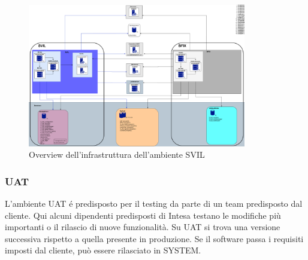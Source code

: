 \begin{figure}[!ht]
    \centering
	\includegraphics[width=0.85\textwidth]{./res/img/svil-diag.png}
    \caption{Overview dell'infrastruttura dell'ambiente SVIL}
\end{figure}

\subsubsection{UAT}

L'ambiente UAT é predisposto per il testing da parte di un team predisposto dal cliente. Qui alcuni dipendenti predisposti di Intesa testano le modifiche più importanti o il rilascio di nuove funzionalità. Su UAT si trova una versione successiva rispetto a quella presente in produzione. Se il software passa i requisiti imposti dal cliente, può essere rilasciato in SYSTEM.

